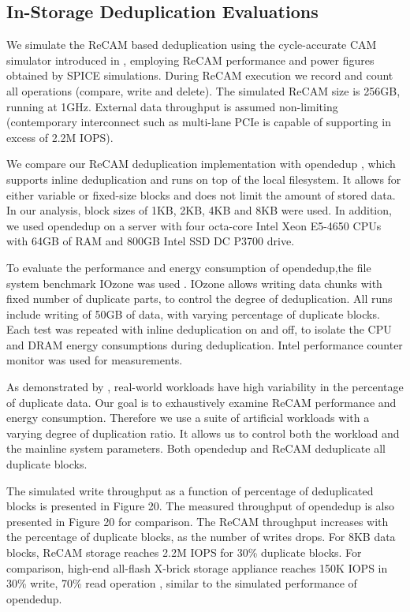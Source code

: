 \documentclass{superfri}
\begin{document}
\subsection{In-Storage Deduplication Evaluations}

We simulate the ReCAM based deduplication using the cycle-accurate CAM simulator introduced in \cite{yavits2015resistive}, employing ReCAM performance and power figures obtained by SPICE simulations. During ReCAM execution we record and count all operations (compare, write and delete).  The simulated ReCAM size is 256GB, running at 1GHz. External data throughput is assumed non-limiting (contemporary interconnect such as multi-lane PCIe is capable of supporting in excess of 2.2M IOPS).

We compare our ReCAM deduplication implementation with opendedup ‎\cite{silverberg2010opendedup}, which supports inline deduplication and runs on top of the local filesystem. It allows for either variable or fixed-size blocks and does not limit the amount of stored data. In our analysis, block sizes of 1KB, 2KB, 4KB and 8KB were used. In addition, we used opendedup on a server with four octa-core Intel Xeon E5-4650 CPUs with 64GB of RAM and 800GB Intel SSD DC P3700 drive.

To evaluate the performance and energy consumption of opendedup,the file system benchmark IOzone was used \cite{norcott2003iozone}. IOzone allows writing data chunks with fixed number of duplicate parts, to control the degree of deduplication. All runs include writing of 50GB of data, with varying percentage of duplicate blocks. Each test was repeated with inline deduplication on and off, to isolate the CPU and DRAM energy consumptions during deduplication. Intel performance counter monitor \cite{intelPCM} was used for measurements. 

As demonstrated by ‎\cite{zhu2008avoiding}, real-world workloads have high variability in the percentage of duplicate data. Our goal is to exhaustively examine ReCAM performance and energy consumption. Therefore we use a suite of artificial workloads with a varying degree of duplication ratio. It allows us to control both the workload and the mainline system parameters. Both opendedup and ReCAM deduplicate all duplicate blocks.

The simulated write throughput as a function of percentage of deduplicated blocks is presented in Figure 20. The measured throughput of opendedup is also presented in Figure 20 for comparison. The ReCAM throughput increases with the percentage of duplicate blocks, as the number of writes drops. For 8KB data blocks, ReCAM storage reaches 2.2M IOPS for 30\% duplicate blocks. For comparison, high-end all-flash X-brick storage appliance reaches 150K IOPS in 30\% write, 70\% read operation ‎\cite{XbrickSpec}, similar to the simulated performance of opendedup. 
\end{document}
